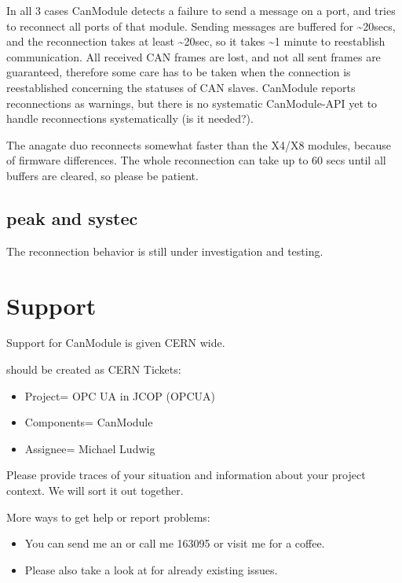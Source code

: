\documentclass[letterpaper,10pt,english]{sphinxmanual}
\begin{document}
In all 3 cases CanModule detects a failure to send a message on a port, and tries to reconnect
all ports of that module. Sending messages are buffered for \textasciitilde{}20secs, and the reconnection
takes at least \textasciitilde{}20sec, so it takes \textasciitilde{}1 minute to reestablish communication. All received CAN frames
are lost, and not all sent frames are guaranteed, therefore some care has to be taken when the
connection is reestablished concerning the statuses of CAN slaves. CanModule reports reconnections
as warnings, but there is no systematic CanModule-API yet to handle reconnections
systematically (is it needed?).

The anagate duo reconnects somewhat faster than the X4/X8 modules, because of firmware differences.
The whole reconnection can take up to 60 secs until all buffers are cleared, so please be patient.


\section{peak and systec}
\label{\detokenize{connection:peak-and-systec}}
The reconnection behavior is still under investigation and testing.


\chapter{Support}
\label{\detokenize{support:support}}\label{\detokenize{support::doc}}
Support for CanModule is given CERN wide.

 should be created as CERN  Tickets:
\begin{itemize}
\item {} 
Project= OPC UA in JCOP (OPCUA)

\item {} 
Components= CanModule

\item {} 
Assignee= Michael Ludwig

\end{itemize}

Please provide traces of your situation and information about your project context. We will sort it out together.

More  ways to get help or report problems:
\begin{itemize}
\item {} 
You can send me an  or call me 163095 or visit me for a coffee.

\item {} 
Please also take a look at  for already existing issues.

\end{itemize}
\end{document}
